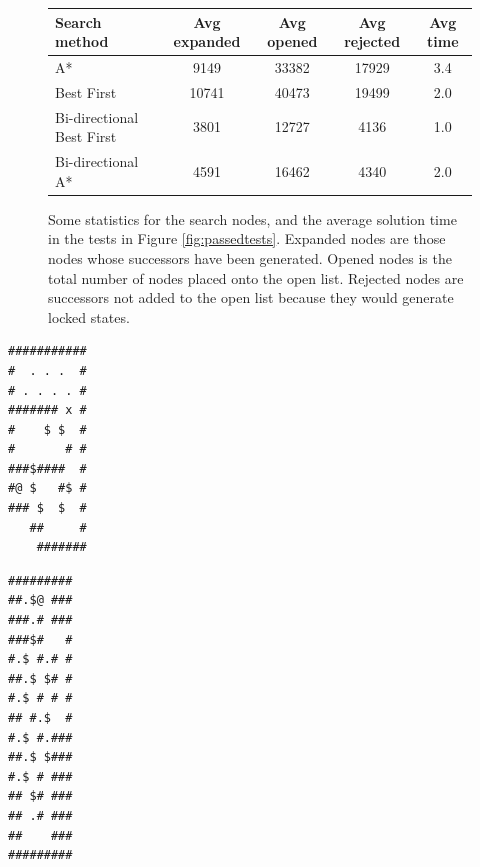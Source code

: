 \documentclass[a4paper,11pt]{article}
\begin{document}
\begin{figure}
  \centering
  \begin{center}
    \begin{tabular}{lcccc}
      Search method              &  Avg expanded  &  Avg opened  &  Avg rejected  &  Avg time  \\
      \hline
      A*                         &          9149  &       33382  &         17929  &           3.4  \\
      Best First                 &         10741  &       40473  &         19499  &           2.0  \\
      Bi-directional Best First  &          3801  &       12727  &          4136  &           1.0  \\
      Bi-directional A*          &          4591  &       16462  &          4340  &           2.0  \\
    \end{tabular}
  \end{center}

  \caption{Some statistics for the search nodes, and the average solution time
    in the tests in Figure \ref{fig:passedtests}. Expanded nodes are those nodes
    whose successors have been generated. Opened nodes is the total number of
    nodes placed onto the open list. Rejected nodes are successors not added to
    the open list because they would generate locked states.}
  \label{fig:timings}
\end{figure}

\begin{lrbox}{\mapff}
  \begin{minipage}{.25\textwidth}
\centering
\begin{BVerbatim}
###########
#  . . .  #
# . . . . #
####### x #
#    $ $  #
#       # #
###$####  #
#@ $   #$ #
### $  $  #
   ##     #
    #######  
\end{BVerbatim}
  \end{minipage}
\end{lrbox}%

\begin{lrbox}{\mapss}
  \begin{minipage}{.25\textwidth}
\centering
\begin{BVerbatim}
#########
##.$@ ###
###.# ###
###$#   #
#.$ #.# #
##.$ $# #
#.$ # # #
## #.$  #
#.$ #.###
##.$ $###
#.$ # ###
## $# ###
## .# ###
##    ###
#########
\end{BVerbatim}
  \end{minipage}
\end{lrbox}%
\end{document}
